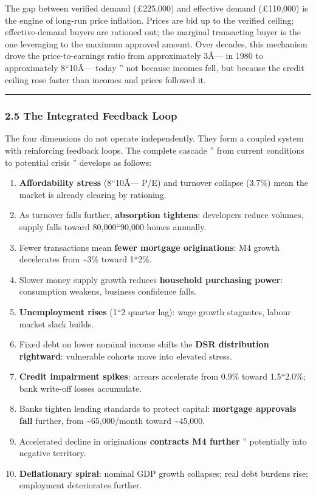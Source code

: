 \documentclass[
]{article}
\providecommand{\tightlist}{%
  \setlength{\itemsep}{0pt}\setlength{\parskip}{0pt}}
\begin{document}
The gap between verified demand (£225,000) and effective demand
(£110,000) is the engine of long-run price inflation. Prices are bid up
to the verified ceiling; effective-demand buyers are rationed out; the
marginal transacting buyer is the one leveraging to the maximum approved
amount. Over decades, this mechanism drove the price-to-earnings ratio
from approximately 3Ã--- in 1980 to approximately 8``10Ã--- today '' not
because incomes fell, but because the credit ceiling rose faster than
incomes and prices followed it.

\begin{center}\rule{0.5\linewidth}{0.5pt}\end{center}

\subsubsection{2.5 The Integrated Feedback
Loop}\label{the-integrated-feedback-loop}

The four dimensions do not operate independently. They form a coupled
system with reinforcing feedback loops. The complete cascade '' from
current conditions to potential crisis '' develops as follows:

\begin{enumerate}
\def\labelenumi{\arabic{enumi}.}
\tightlist
\item
  \textbf{Affordability stress} (8``10Ã--- P/E) and turnover collapse
  (3.7\%) mean the market is already clearing by rationing.
\item
  As turnover falls further, \textbf{absorption tightens}: developers
  reduce volumes, supply falls toward 80,000``90,000 homes annually.
\item
  Fewer transactions mean \textbf{fewer mortgage originations}: M4
  growth decelerates from \textasciitilde3\% toward 1``2\%.
\item
  Slower money supply growth reduces \textbf{household purchasing
  power}: consumption weakens, business confidence falls.
\item
  \textbf{Unemployment rises} (1``2 quarter lag): wage growth stagnates,
  labour market slack builds.
\item
  Fixed debt on lower nominal income shifts the \textbf{DSR distribution
  rightward}: vulnerable cohorts move into elevated stress.
\item
  \textbf{Credit impairment spikes}: arrears accelerate from 0.9\%
  toward 1.5``2.0\%; bank write-off losses accumulate.
\item
  Banks tighten lending standards to protect capital: \textbf{mortgage
  approvals fall} further, from \textasciitilde65,000/month toward
  \textasciitilde45,000.
\item
  Accelerated decline in originations \textbf{contracts M4 further} ''
  potentially into negative territory.
\item
  \textbf{Deflationary spiral}: nominal GDP growth collapses; real debt
  burdens rise; employment deteriorates further.
\end{enumerate}
\end{document}
